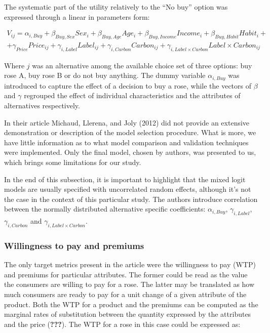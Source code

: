 \documentclass[11pt,]{article}
\begin{document}
The systematic part of the utility relatively to the ``No buy'' option
was expressed through a linear in parameters form:

\begin{multline}
V_{ij} = \alpha_{i,Buy} + \beta_{Buy, Sex} Sex_i + \beta_{Buy, Age} Age_i + \beta_{Buy, Income} Income_i + \beta_{Buy, Habit} Habit_i + \\
+ \gamma_{Price} Price_{ij} + \gamma_{i, Label} Label_{ij} + \gamma_{i, Carbon} Carbon_{ij} + \gamma_{i, Label \times Carbon} Label \times Carbon_{ij}
\end{multline}

Where \(j\) was an alternative among the available choice set of three
options: buy rose A, buy rose B or do not buy anything. The dummy
variable \(\alpha_{i,Buy}\) was introduced to capture the effect of a
decision to buy a rose, while the vectors of \(\beta\) and \(\gamma\)
regrouped the effect of individual characteristics and the attributes of
alternatives respectively.

In their article Michaud, Llerena, and Joly (2012) did not provide an
extensive demonstration or description of the model selection procedure.
What is more, we have little information as to what model comparison and
validation techniques were implemented. Only the final model, chosen by
authors, was presented to us, which brings some limitations for our
study.

In the end of this subsection, it is important to highlight that the
mixed logit models are usually specified with uncorrelated random
effects, although it's not the case in the context of this particular
study. The authors introduce correlation between the normally
distributed alternative specific coefficients: \(\alpha_{i,Buy}\),
\(\gamma_{i, Label}\), \(\gamma_{i, Carbon}\) and
\(\gamma_{i, Label \times Carbon}\).

\hypertarget{willingness-to-pay-and-premiums}{%
\subsubsection{Willingness to pay and
premiums}\label{willingness-to-pay-and-premiums}}

The only target metrics present in the article were the willingness to
pay (WTP) and premiums for particular attributes. The former could be
read as the value the consumers are willing to pay for a rose. The
latter may be translated as how much consumers are ready to pay for a
unit change of a given attribute of the product. Both the WTP for a
product and the premiums can be computed as the marginal rates of
substitution between the quantity expressed by the attributes and the
price ({\textbf{???}}). The WTP for a rose in this case could be
expressed as:
\end{document}

